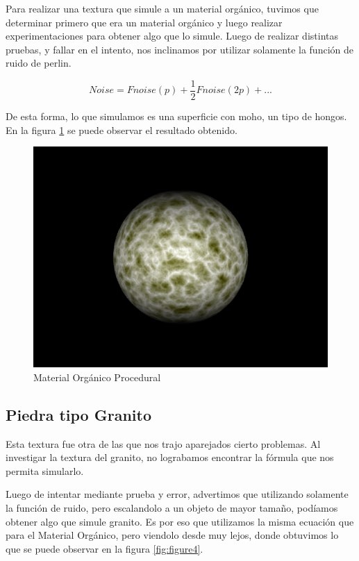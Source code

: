 \documentclass[a4paper,10pt]{article}
\begin{document}
Para realizar una textura que simule a un material orgánico, tuvimos que
determinar primero que era un material orgánico y luego realizar
experimentaciones para obtener algo que lo simule.  Luego de realizar distintas
pruebas, y fallar en el intento, nos inclinamos por utilizar solamente la
función de ruido de perlin.

\begin{equation}
 Noise = Fnoise(p) + \frac{1}{2} Fnoise(2p) + ...
\end{equation}

De esta forma, lo que simulamos es una superficie con moho, un tipo de
hongos.  En la figura \ref{fig:figure3} se puede observar el resultado obtenido.

\begin{figure}[h!]
 \centering
 \includegraphics[scale=0.5]{./proceduralOrganic.png}
 \caption{Material Orgánico Procedural}
 \label{fig:figure3}
\end{figure}

\subsection{Piedra tipo Granito}

Esta textura fue otra de las que nos trajo aparejados cierto problemas.  Al
investigar la textura del granito, no lograbamos encontrar la fórmula que nos
permita simularlo.

Luego de intentar mediante prueba y error, advertimos que utilizando solamente
la función de ruido, pero escalandolo a un objeto de mayor tamaño, podíamos
obtener algo que simule granito.  Es por eso que utilizamos la misma ecuación
que para el Material Orgánico, pero viendolo desde muy lejos, donde obtuvimos
lo que se puede observar en la figura \ref{fig:figure4}.
\end{document}
